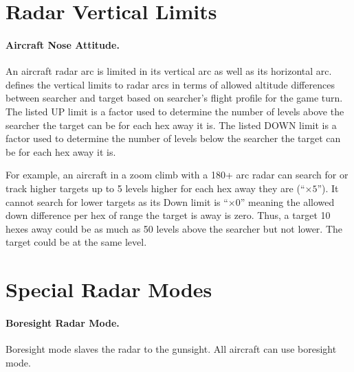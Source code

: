 \begin{advancedrules}
\section{Radar Vertical Limits}

\paragraph{Aircraft Nose Attitude.} An aircraft radar arc is limited in its vertical arc as well as its horizontal arc.  defines the vertical limits to radar arcs in terms of allowed altitude differences between searcher and target based on searcher's flight profile for the game turn. The listed UP limit is a factor used to determine the number of levels above the searcher the target can be for each hex away it is. The listed DOWN limit is a factor used to determine the number of levels below the searcher the target can be for each hex away it is. 

For example, an aircraft in a zoom climb with a 180+ arc radar can search for or track higher targets up to 5 levels higher for each hex away they are (“$\times5$”). It cannot search for lower targets as its Down limit is “$\times0$” meaning the allowed down difference per hex of range the target is away is zero. Thus, a target 10 hexes away could be as much as 50 levels above the searcher but not lower. The target could be at the same level.

\section{Special Radar Modes}
\label{rule:special-radar-modes}

\paragraph{Boresight Radar Mode.} Boresight mode slaves the radar to the gunsight. All aircraft can use boresight mode.  


\end{advancedrules}
